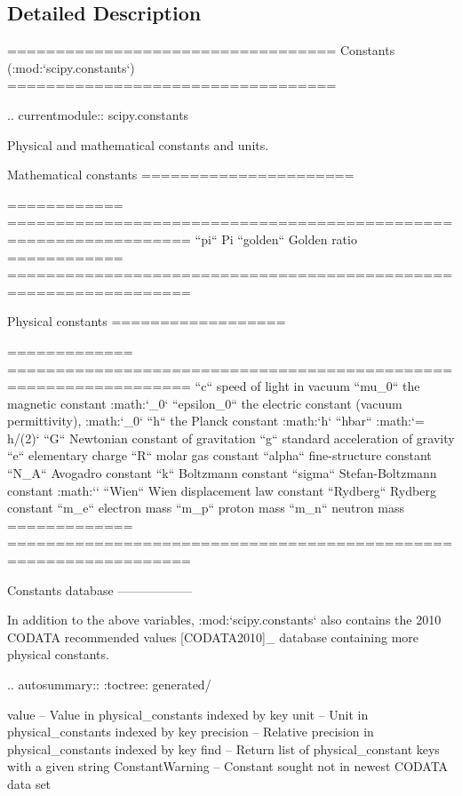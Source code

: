 \subsection{Detailed Description}
\begin{DoxyVerb}==================================
Constants (:mod:`scipy.constants`)
==================================

.. currentmodule:: scipy.constants

Physical and mathematical constants and units.


Mathematical constants
======================

============  =================================================================
``pi``        Pi
``golden``    Golden ratio
============  =================================================================


Physical constants
==================

=============  =================================================================
``c``          speed of light in vacuum
``mu_0``       the magnetic constant :math:`\mu_0`
``epsilon_0``  the electric constant (vacuum permittivity), :math:`\epsilon_0`
``h``          the Planck constant :math:`h`
``hbar``       :math:`\hbar = h/(2\pi)`
``G``          Newtonian constant of gravitation
``g``          standard acceleration of gravity
``e``          elementary charge
``R``          molar gas constant
``alpha``      fine-structure constant
``N_A``        Avogadro constant
``k``          Boltzmann constant
``sigma``      Stefan-Boltzmann constant :math:`\sigma`
``Wien``       Wien displacement law constant
``Rydberg``    Rydberg constant
``m_e``        electron mass
``m_p``        proton mass
``m_n``        neutron mass
=============  =================================================================


Constants database
------------------

In addition to the above variables, :mod:`scipy.constants` also contains the
2010 CODATA recommended values [CODATA2010]_ database containing more physical
constants.

.. autosummary::
   :toctree: generated/

   value      -- Value in physical_constants indexed by key
   unit       -- Unit in physical_constants indexed by key
   precision  -- Relative precision in physical_constants indexed by key
   find       -- Return list of physical_constant keys with a given string
   ConstantWarning -- Constant sought not in newest CODATA data set


\end{DoxyVerb}
